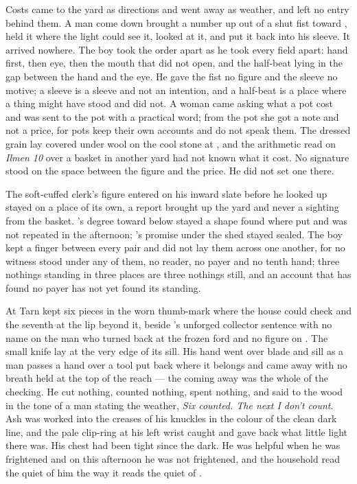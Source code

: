 Costs came to the yard as directions and went away as weather, and left no entry behind them. A man come down  brought a number up out of a shut fist toward , held it where the light could see it, looked at it, and put it back into his sleeve. It arrived nowhere. The boy took the order apart as he took every field apart: hand first, then eye, then the mouth that did not open, and the half-beat lying in the gap between the hand and the eye. He gave the fist no figure and the sleeve no motive; a sleeve is a sleeve and not an intention, and a half-beat is a place where a thing might have stood and did not. A woman came asking what a pot cost and was sent to the pot with a practical word; from the pot she got a note and not a price, for pots keep their own accounts and do not speak them. The dressed grain lay covered under wool on the cool stone at , and the arithmetic read on \emph{Ilmen 10} over a basket in another yard had not known what it cost. No signature stood on the space between the figure and the price. He did not set one there.

The soft-cuffed clerk's figure entered on his inward slate before he looked up stayed on a place of its own, a report brought up the yard and never a sighting from the basket. 's degree toward  below  stayed a shape found where put and was not repeated in the afternoon; 's promise under the shed stayed sealed. The boy kept a finger between every pair and did not lay them across one another, for no witness stood under any of them, no reader, no payer and no tenth hand; three nothings standing in three places are three nothings still, and an account that has found no payer has not yet found its standing.

At  Tarn kept six pieces in the worn thumb-mark where the house could check and the seventh at the lip beyond it, beside 's unforged collector sentence with no name on the man who turned back at the frozen ford and no figure on . The small knife lay at the very edge of its sill. His hand went over blade and sill as a man passes a hand over a tool put back where it belongs and came away with no breath held at the top of the reach --- the coming away was the whole of the checking. He cut nothing, counted nothing, spent nothing, and said to the wood in the tone of a man stating the weather, \emph{Six counted. The next I don't count}. Ash was worked into the creases of his knuckles in the colour of the clean dark line, and the pale clip-ring at his left wrist caught and gave back what little light there was. His chest had been tight since the dark. He was helpful when he was frightened and on this afternoon he was not frightened, and the household read the quiet of him the way it reads the quiet of .


